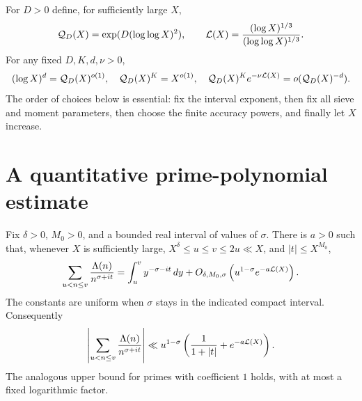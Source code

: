 For $D>0$ define, for sufficiently large $X$,
\[
 \mathcal Q_D(X)=\exp(D(\log\log X)^2),\qquad
 \mathcal L(X)=\frac{(\log X)^{1/3}}{(\log\log X)^{1/3}}.
\]
For any fixed $D,K,d,\nu>0$,
\begin{equation}\label{eq:hierarchy}
 (\log X)^d=\mathcal Q_D(X)^{o(1)},\quad
 \mathcal Q_D(X)^K=X^{o(1)},\quad
 \mathcal Q_D(X)^K e^{-\nu\mathcal L(X)}=o(\mathcal Q_D(X)^{-d}).
\end{equation}
The order of choices below is essential: fix the interval exponent,
then fix all sieve and moment parameters, then choose the finite
accuracy powers, and finally let $X$ increase.

\section{A quantitative prime-polynomial estimate}

\begin{lemma}\label{lem:vk}
Fix $\delta>0$, $M_0>0$, and a bounded real interval of values of $\sigma$.
There is $a>0$ such that, whenever $X$ is sufficiently large,
$X^\delta\le u\le v\le2u\ll X$, and $|t|\le X^{M_0}$,
\[
 \sum_{u<n\le v}\frac{\Lambda(n)}{n^{\sigma+it}}
   =\int_u^v y^{-\sigma-it}\,dy
     +O_{\delta,M_0,\sigma}\left(u^{1-\sigma}e^{-a\mathcal L(X)}\right).
\]
The constants are uniform when $\sigma$ stays in the indicated compact
interval. Consequently
\[
 \left|\sum_{u<n\le v}\frac{\Lambda(n)}{n^{\sigma+it}}\right|
 \ll u^{1-\sigma}
       \left(\frac1{1+|t|}+e^{-a\mathcal L(X)}\right).
\]
The analogous upper bound for primes with coefficient $1$ holds, with at
most a fixed logarithmic factor.
\end{lemma}

